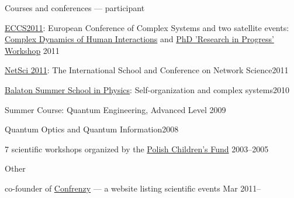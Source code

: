 \documentclass[margin,line]{resume}
\begin{document}
\begin{resume}
	Courses and conferences --- participant 
	        \begin{list2}
	    \item \href{http://www.eccs2011.eu/}{ECCS2011}: European Conference of Complex Systems and two satellite events: \href{http://markov.uc3m.es/complexdynamics11/Home.html}{Complex Dynamics of Human Interactions} and \href{http://cssociety.org/PhDVienna2011}{PhD 'Research in Progress' Workshop}  \hfill 2011
	    \item \href{http://netsci2011.net/}{NetSci 2011}: The International School and Conference on Network Science\hfill 2011
	    \item \href{http://bss.mafihe.hu/}{Balaton Summer School in Physics}: Self-organization and complex systems\hfill 2010
        \item {Summer Course: Quantum Engineering, Advanced Level} \hfill 2009
        \item {Quantum Optics and Quantum Information}\hfill 2008 
        \item 7 scientific workshops organized by the \href{http://www.fundusz.org/?lang=gb}{Polish Children's Fund} \hfill 2003--2005
                \end{list2} 
       
     Other
	        \begin{list2}
	    \item co-founder of \href{http://confrenzy.com}{Confrenzy} --- a website listing scientific events \hfill Mar 2011--
                \end{list2} 



\vspace{3mm}


\end{resume}
\end{document}
